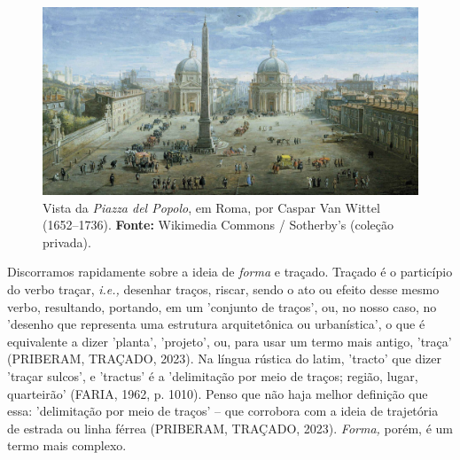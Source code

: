 \documentclass[twoside, 12pt, english,italian,latin,greek,french,spanish,brazil]{book}
\begin{document}
    \begin{figure}[h]%
        \centering
        \includegraphics[width=1\textwidth]{Pictures/popolo.jpeg}
        \captionsetup{labelfont=bf}
        \caption{Vista da \textit{Piazza del Popolo}, em Roma, por Caspar Van Wittel (1652–1736). \textbf{Fonte:} Wikimedia Commons / Sotherby's (coleção privada).}
        \label{fig:popolo}
    \end{figure} 

    Discorramos rapidamente sobre a ideia de \textit{forma} e traçado. Traçado é o particípio do verbo traçar, \textit{i.e.,} desenhar traços, riscar, sendo o ato ou efeito desse mesmo verbo, resultando, portando, em um 'conjunto de traços', ou, no nosso caso, no 'desenho que representa uma estrutura arquitetônica ou urbanística', o que é equivalente a dizer 'planta', 'projeto', ou, para usar um termo mais antigo, 'traça' (PRIBERAM, TRAÇADO, 2023). Na língua rústica do latim, 'tracto' que dizer 'traçar sulcos', e 'tractus' é a 'delimitação por meio de traços; região, lugar, quarteirão' (FARIA, 1962, p. 1010). Penso que não haja melhor definição que essa: 'delimitação por meio de traços' – que corrobora com a ideia de trajetória de estrada ou linha férrea (PRIBERAM, TRAÇADO, 2023). \textit{Forma,} porém, é um termo mais complexo.
    
\end{document}
